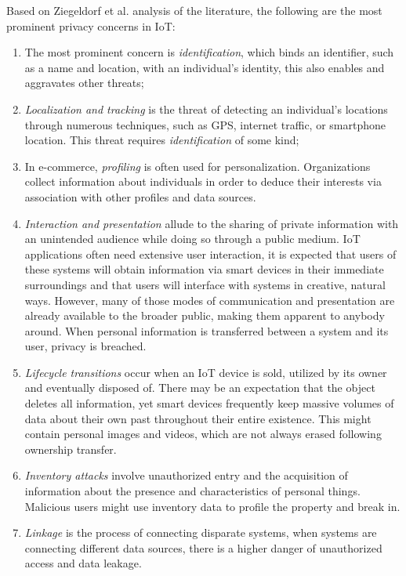 Based on Ziegeldorf et al. \cite{ziegeldorf2014privacy} analysis of the literature,
the following are the most prominent privacy concerns in IoT:

\begin{enumerate}
    \item
    The most prominent concern is \textit{identification}, which binds an
    identifier, such as a name and location, with an individual's identity,
    this also enables and aggravates other threats;
    \item
    \textit{Localization and tracking} is the threat of detecting an individual's
    locations through numerous techniques, such as GPS, internet traffic,
    or smartphone location. This threat requires \textit{identification}
    of some kind;
    \item
    In e-commerce, \textit{profiling} is often used for personalization.
    Organizations collect information about individuals in order to deduce
    their interests via association with other profiles and data sources.
    \item
    \textit{Interaction and presentation} allude to the sharing of private
    information with an unintended audience while doing so through a public
    medium. IoT applications often need extensive user interaction, it is
    expected that users of these systems will obtain information via smart
    devices in their immediate surroundings and that users will interface
    with systems in creative, natural ways. However, many of those modes
    of communication and presentation are already available to the broader
    public, making them apparent to anybody around. When personal information
    is transferred between a system and its user, privacy is breached.
    \item
    \textit{Lifecycle transitions} occur when an IoT device is sold, utilized
    by its owner and eventually disposed of. There may be an expectation
    that the object deletes all information, yet smart devices frequently
    keep massive volumes of data about their own past throughout their entire
    existence. This might contain personal images and videos, which are
    not always erased following ownership transfer.
    \item
    \textit{Inventory attacks} involve unauthorized entry and the acquisition
    of information about the presence and characteristics of personal things.
    Malicious users might use inventory data to profile the property and
    break in.
    \item
    \textit{Linkage} is the process of connecting disparate systems, when
    systems are connecting different data sources, there is a higher danger
    of unauthorized access and data leakage.
\end{enumerate}

